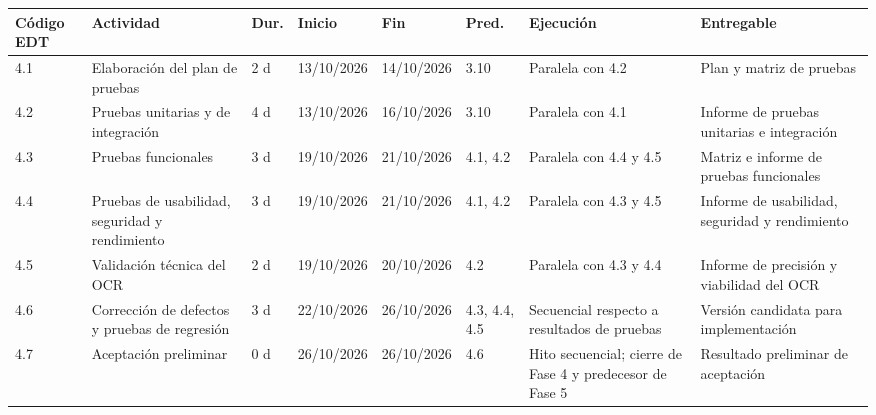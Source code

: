 \documentclass[12pt,a4paper]{article}
\begin{document}
\begin{landscape}
\begin{center}
\setlength{\tabcolsep}{3pt}
\renewcommand{\arraystretch}{1.15}
\fontsize{7.2}{8.5}\selectfont
\begin{tabularx}{\linewidth}{|p{0.85cm}|p{4.0cm}|p{0.75cm}|p{1.45cm}|p{1.45cm}|p{1.4cm}|p{4.0cm}|X|}
\hline
\rowcolor{tableheader}
\textbf{Código EDT} & \textbf{Actividad} & \textbf{Dur.} & \textbf{Inicio} & \textbf{Fin} & \textbf{Pred.} & \textbf{Ejecución} & \textbf{Entregable} \\ \hline
4.1 & Elaboración del plan de pruebas & 2 d & 13/10/2026 & 14/10/2026 & 3.10 & Paralela con 4.2 & Plan y matriz de pruebas \\ \hline
4.2 & Pruebas unitarias y de integración & 4 d & 13/10/2026 & 16/10/2026 & 3.10 & Paralela con 4.1 & Informe de pruebas unitarias e integración \\ \hline
4.3 & Pruebas funcionales & 3 d & 19/10/2026 & 21/10/2026 & 4.1, 4.2 & Paralela con 4.4 y 4.5 & Matriz e informe de pruebas funcionales \\ \hline
4.4 & Pruebas de usabilidad, seguridad y rendimiento & 3 d & 19/10/2026 & 21/10/2026 & 4.1, 4.2 & Paralela con 4.3 y 4.5 & Informe de usabilidad, seguridad y rendimiento \\ \hline
4.5 & Validación técnica del OCR & 2 d & 19/10/2026 & 20/10/2026 & 4.2 & Paralela con 4.3 y 4.4 & Informe de precisión y viabilidad del OCR \\ \hline
4.6 & Corrección de defectos y pruebas de regresión & 3 d & 22/10/2026 & 26/10/2026 & 4.3, 4.4, 4.5 & Secuencial respecto a resultados de pruebas & Versión candidata para implementación \\ \hline
4.7 & Aceptación preliminar & 0 d & 26/10/2026 & 26/10/2026 & 4.6 & Hito secuencial; cierre de Fase 4 y predecesor de Fase 5 & Resultado preliminar de aceptación \\ \hline
\end{tabularx}
\end{center}
\end{landscape}
\end{document}
